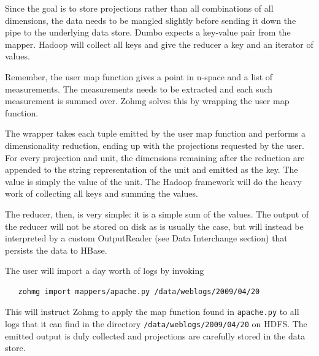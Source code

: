Since the goal is to store projections rather than all combinations of all
dimensions, the data needs to be mangled slightly before sending it down
the pipe to the underlying data store. Dumbo expects a key-value pair from the
mapper. Hadoop will collect all keys and give the reducer a key and an iterator
of values.

%

Remember, the user map function gives a point in n-space and a list of
measurements. The measurements needs to be extracted and each such measurement
is summed over. Zohmg solves this by wrapping the user map function.

The wrapper takes each tuple emitted by the user map function and performs a
dimensionality reduction, ending up with the projections requested by the user.
For every projection and unit, the dimensions remaining after the reduction are
appended to the string representation of the unit and emitted as the key. The
value is simply the value of the unit. The Hadoop framework will do the heavy
work of collecting all keys and summing the values.


The reducer, then, is very simple: it is a simple sum of the values. The output
of the reducer will not be stored on disk as is usually the case, but will
instead be interpreted by a custom OutputReader (see Data Interchange section)
that persists the data to HBase.

The user will import a day worth of logs by invoking

\begin{verbatim}
   zohmg import mappers/apache.py /data/weblogs/2009/04/20
\end{verbatim}

This will instruct Zohmg to apply the map function found in \texttt{apache.py}
to all logs that it can find in the directory \texttt{/data/weblogs/2009/04/20}
on HDFS. The emitted output is duly collected and projections are carefully
stored in the data store.


